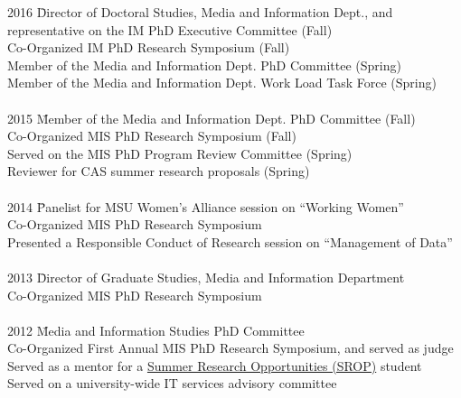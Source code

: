 \documentclass[9pt]{extarticle}
\begin{document}
\begin{tabbing}
2016 \hspace{0.3in}\= Director of Doctoral Studies, Media and Information Dept., and \\
\> \hspace{0.5cm} representative on the IM PhD Executive Committee (Fall) \\
\> Co-Organized IM PhD Research Symposium (Fall) \\ %
\> Member of the Media and Information Dept. PhD Committee (Spring) \\ 
\> Member of the Media and Information Dept. Work Load Task Force (Spring) \\\\

2015 \hspace{0.3in}\= Member of the Media and Information Dept. PhD Committee (Fall) \\ %
\> Co-Organized MIS PhD Research Symposium (Fall) \\ %
\> Served on the MIS PhD Program Review Committee (Spring) \\ %
\> Reviewer for CAS summer research proposals (Spring) \\\\ %

2014 \hspace{0.3in}\=  Panelist for MSU Women's Alliance session on ``Working Women'' \\ %
\> Co-Organized MIS PhD Research Symposium \\ %
\> Presented a Responsible Conduct of Research session on ``Management of Data'' \\\\ %

2013 \hspace{0.3in}\=  Director of Graduate Studies, Media and Information Department \\
\> Co-Organized MIS PhD Research Symposium \\\\ 

2012 \hspace{0.3in}\=  Media and Information Studies PhD Committee \\
\> Co-Organized First Annual MIS PhD Research Symposium, and served as judge \\ %
\> Served as a mentor for a \href{https://grad.msu.edu/srop}{Summer Research Opportunities (SROP)} student \\ %
\> Served on a university-wide IT services advisory committee \\ %
\end{tabbing}
\end{document}
